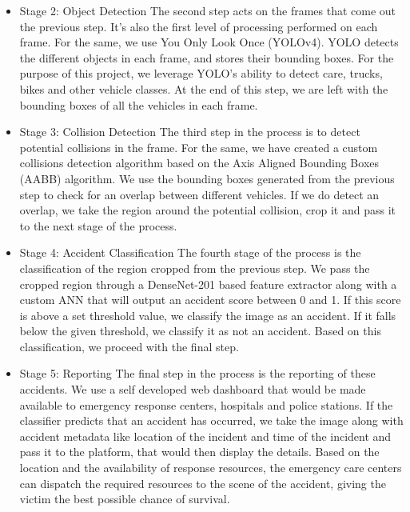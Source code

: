 \documentclass[ 12pt,a4paper,twocolumn,fleqn]{article}
\begin{document}
\begin{adjustwidth}{3.5em}{0pt}
\begin{itemize}
    \item{Stage 2: Object Detection
The second step acts on the frames that come out the previous step. It's also the first level of processing performed on each frame. For the same, we use You Only Look Once (YOLOv4).
YOLO detects the different objects in each frame, and stores their bounding boxes. For the purpose of this project, we leverage YOLO's ability to detect care, trucks, bikes and other vehicle classes. At the end of this step, we are left with the bounding boxes of all the vehicles in each frame.}
    \item{Stage 3: Collision Detection
The third step in the process is to detect potential collisions in the frame. For the same, we have created a custom collisions detection algorithm based on the Axis Aligned Bounding Boxes (AABB) algorithm. We use the bounding boxes generated from the previous step to check for an overlap between different vehicles. If we do detect an overlap, we take the region around the potential collision, crop it and pass it to the next stage of the process.}
    \item{Stage 4: Accident Classification 
The fourth stage of the process is the classification of the region cropped from the previous step. We pass the cropped region through a DenseNet-201 based feature extractor along with a custom ANN that will output an accident score between 0 and 1. If this score is above a set threshold value, we classify the image as an accident. If it falls below the given threshold, we classify it as not an accident. Based on this classification, we proceed with the final step.}
\item{Stage 5: Reporting
The final step in the process is the reporting of these accidents. We use a self developed web dashboard that would be made available to emergency response centers, hospitals and police stations. If the classifier predicts that an accident has occurred, we take the image along with accident metadata like location of the incident and time of the incident and pass it to the platform, that would then display the details. Based on the location and the availability of response resources, the emergency care centers can dispatch the required resources to the scene of the accident, giving the victim the best possible chance of survival.
}
\end{itemize}

\newpage
  \pagestyle{fancy}


\end{adjustwidth}
\end{document}
